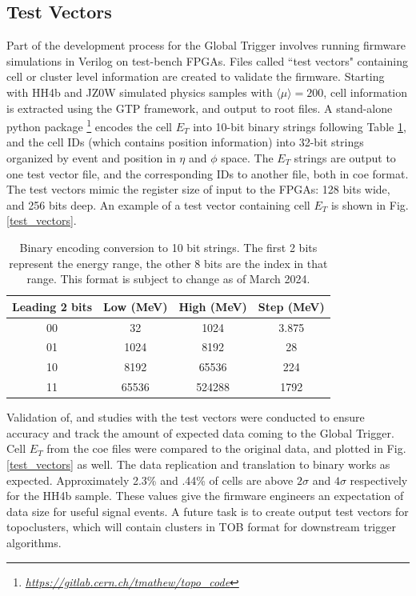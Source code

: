 \FloatBarrier
\subsection{Test Vectors}

Part of the development process for the Global Trigger involves running firmware simulations in Verilog on test-bench FPGAs.  
Files called ``test vectors" containing cell or cluster level information are created to validate the firmware.
Starting with HH4b and JZ0W simulated physics samples with $\langle\mu\rangle=200$, cell information is extracted using the GTP framework, and output to {\selectfont root} files. 
A stand-alone {\selectfont python} package \footnote{\href{https://gitlab.cern.ch/tmathew/topo_code}{\normalfont \slshape https://gitlab.cern.ch/tmathew/topo\_code}} encodes the cell $E_T$ into 10-bit binary strings following Table \ref{binary}, and the cell IDs (which contains position information) into 32-bit strings organized by event and position in $\eta$ and $\phi$ space.
The $E_T$ strings are output to one test vector file, and the corresponding IDs to another file, both in {\selectfont coe} format.
The test vectors mimic the register size of input to the FPGAs: 128 bits wide, and 256 bits deep. 
An example of a test vector containing cell $E_T$ is shown in Fig. \ref{test_vectors}.\\

\begin{table}[h!]
\centering
\caption{Binary encoding conversion to 10 bit strings. The first 2 bits represent the energy range, the other 8 bits are the index in that range. This format is subject to change as of March 2024.}
\begin{tabular}{ c c c c } 
 \hline
 Leading 2 bits & Low (MeV) & High (MeV) & Step (MeV)\\
 \hline
 00 & 32 & 1024 & 3.875 \\ 
 01 & 1024 & 8192 & 28 \\ 
 10 & 8192 & 65536 & 224 \\ 
 11 & 65536 & 524288 & 1792\\
\hline
\end{tabular}
\label{binary}
\end{table}

Validation of, and studies with the test vectors were conducted to ensure accuracy and track the amount of expected data coming to the Global Trigger.
Cell $E_T$ from the {\selectfont coe} files were compared to the original data, and plotted in Fig. \ref{test_vectors} as well.
The data replication and translation to binary works as expected. 
Approximately 2.3\% and .44\% of cells are above $2\sigma$ and $4\sigma$ respectively for the HH4b sample.
These values give the firmware engineers an expectation of data size for useful signal events.
A future task is to create output test vectors for topoclusters, which will contain clusters in TOB format for downstream trigger algorithms.


